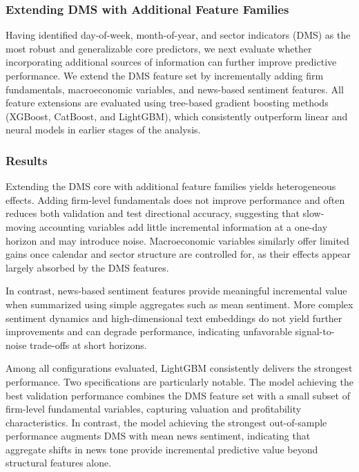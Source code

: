\documentclass[11pt]{article}
\begin{document}
\subsubsection{Extending DMS with Additional Feature Families}

Having identified day-of-week, month-of-year, and sector indicators (DMS) as the most robust and generalizable core predictors, we next evaluate whether incorporating additional sources of information can further improve predictive performance. 
We extend the DMS feature set by incrementally adding firm fundamentals, macroeconomic variables, and news-based sentiment features. All feature extensions are evaluated using tree-based gradient boosting methods (XGBoost, CatBoost, and LightGBM), which consistently outperform linear and neural models in earlier stages of the analysis.

\subsubsection*{Results}
\noindent Extending the DMS core with additional feature families yields heterogeneous effects. 
Adding firm-level fundamentals does not improve performance and often reduces both validation and test directional accuracy, suggesting that slow-moving accounting variables add little incremental information at a one-day horizon and may introduce noise.
Macroeconomic variables similarly offer limited gains once calendar and sector structure are controlled for, as their effects appear largely absorbed by the DMS features.

\vspace{6pt}
\noindent In contrast, news-based sentiment features provide meaningful incremental value when summarized using simple aggregates such as mean sentiment. 
More complex sentiment dynamics and high-dimensional text embeddings do not yield further improvements and can degrade performance, indicating unfavorable signal-to-noise trade-offs at short horizons.

\vspace{6pt}
\noindent Among all configurations evaluated, LightGBM consistently delivers the strongest performance. 
Two specifications are particularly notable. 
The model achieving the best validation performance combines the DMS feature set with a small subset of firm-level fundamental variables, capturing valuation and profitability characteristics. 
In contrast, the model achieving the strongest out-of-sample performance augments DMS with mean news sentiment, indicating that aggregate shifts in news tone provide incremental predictive value beyond structural features alone.
\end{document}
